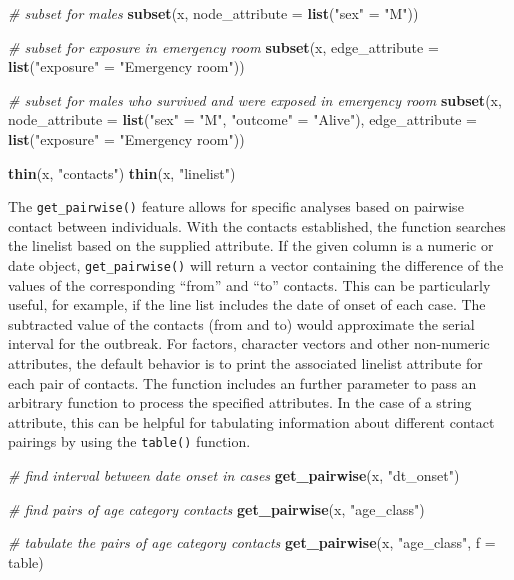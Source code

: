 \documentclass[9pt,a4paper,]{extarticle}
\newenvironment{Shaded}{\begin{snugshade}}{\end{snugshade}}
\newcommand{\KeywordTok}[1]{\textcolor[rgb]{0.13,0.29,0.53}{\textbf{#1}}}
\newcommand{\DataTypeTok}[1]{\textcolor[rgb]{0.13,0.29,0.53}{#1}}
\newcommand{\StringTok}[1]{\textcolor[rgb]{0.31,0.60,0.02}{#1}}
\newcommand{\CommentTok}[1]{\textcolor[rgb]{0.56,0.35,0.01}{\textit{#1}}}
\newcommand{\NormalTok}[1]{#1}
\theoremstyle{definition}
\theoremstyle{definition}
\theoremstyle{definition}
\theoremstyle{remark}
\begin{document}
\begin{Shaded}
\begin{Highlighting}[]
\CommentTok{# subset for males}
\KeywordTok{subset}\NormalTok{(x, }\DataTypeTok{node_attribute =} \KeywordTok{list}\NormalTok{(}\StringTok{"sex"}\NormalTok{ =}\StringTok{ "M"}\NormalTok{))}

\CommentTok{# subset for exposure in emergency room}
\KeywordTok{subset}\NormalTok{(x, }\DataTypeTok{edge_attribute =} \KeywordTok{list}\NormalTok{(}\StringTok{"exposure"}\NormalTok{ =}\StringTok{ "Emergency room"}\NormalTok{))}

\CommentTok{# subset for males who survived and were exposed in emergency room}
\KeywordTok{subset}\NormalTok{(x,}
       \DataTypeTok{node_attribute =} \KeywordTok{list}\NormalTok{(}\StringTok{"sex"}\NormalTok{ =}\StringTok{ "M"}\NormalTok{, }\StringTok{"outcome"}\NormalTok{ =}\StringTok{ "Alive"}\NormalTok{),}
       \DataTypeTok{edge_attribute =} \KeywordTok{list}\NormalTok{(}\StringTok{"exposure"}\NormalTok{ =}\StringTok{ "Emergency room"}\NormalTok{))}

\KeywordTok{thin}\NormalTok{(x, }\StringTok{"contacts"}\NormalTok{)}
\KeywordTok{thin}\NormalTok{(x, }\StringTok{"linelist"}\NormalTok{)  }
\end{Highlighting}
\end{Shaded}

The \texttt{get\_pairwise()} feature allows for specific analyses based on pairwise contact between individuals. With the contacts established, the function searches the linelist based on the supplied attribute. If the given column is a numeric or date object, \texttt{get\_pairwise()} will return a vector containing the difference of the values of the corresponding ``from'' and ``to'' contacts. This can be particularly useful, for example, if the line list includes the date of onset of each case. The subtracted value of the contacts (from and to) would approximate the serial interval for the outbreak\citep{fine:2003}. For factors, character vectors and other non-numeric attributes, the default behavior is to print the associated linelist attribute for each pair of contacts. The function includes an further parameter to pass an arbitrary function to process the specified attributes. In the case of a string attribute, this can be helpful for tabulating information about different contact pairings by using the \texttt{table()} function.

\begin{Shaded}
\begin{Highlighting}[]
\CommentTok{# find interval between date onset in cases}
\KeywordTok{get_pairwise}\NormalTok{(x, }\StringTok{"dt_onset"}\NormalTok{)}

\CommentTok{# find pairs of age category contacts}
\KeywordTok{get_pairwise}\NormalTok{(x, }\StringTok{"age_class"}\NormalTok{)}

\CommentTok{# tabulate the pairs of age category contacts}
\KeywordTok{get_pairwise}\NormalTok{(x, }\StringTok{"age_class"}\NormalTok{, }\DataTypeTok{f =}\NormalTok{ table)}
\end{Highlighting}
\end{Shaded}
\end{document}
